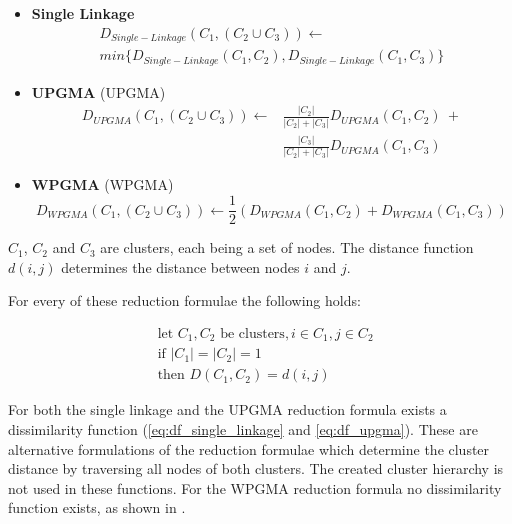 \begin{itemize}
    \item \textbf{Single Linkage}
    \begin{multline}
    D_{Single-Linkage}(C_1, (C_2 \cup C_3)) \leftarrow \\
    min \{ D_{Single-Linkage}(C_1, C_2), D_{Single-Linkage}(C_1, C_3) \}
    \end{multline}
    \item \textbf{\acrshort{UPGMA}} (\acrlong{UPGMA})
    \begin{equation}
    \begin{split}
    D_{UPGMA}(C_1, (C_2 \cup C_3)) \leftarrow &\frac{|C_2|}{|C_2|+|C_3|}D_{UPGMA}(C_1, C_2)\ + \\ &\frac{|C_3|}{|C_2|+|C_3|}D_{UPGMA}(C_1, C_3)
    \end{split}
    \end{equation}
    \item \textbf{\acrshort{WPGMA}} (\acrlong{WPGMA})
    \begin{equation}
    D_{WPGMA}(C_1, (C_2 \cup C_3)) \leftarrow \frac{1}{2} (D_{WPGMA}(C_1, C_2) + D_{WPGMA}(C_1, C_3))
    \end{equation}
\end{itemize}

$C_1$, $C_2$ and $C_3$ are clusters, each being a set of nodes. The distance function $d(i, j)$ determines the distance between nodes $i$ and $j$.

For every of these reduction formulae the following holds:

\begin{equation}
\begin{split}
&\textrm{let }C_1, C_2\textrm{ be clusters}, i \in C_1, j \in C_2 \\
&\textrm{if }|C_1| = |C_2| = 1 \\
&\textrm{then }D(C_1, C_2) = d(i, j)
\end{split}
\end{equation}

For both the single linkage and the \acrshort{UPGMA} reduction formula exists a dissimilarity function (\ref{eq:df_single_linkage} and \ref{eq:df_upgma}). These are alternative formulations of the reduction formulae which determine the cluster distance by traversing all nodes of both clusters. The created cluster hierarchy is not used in these functions. For the \acrshort{WPGMA} reduction formula no dissimilarity function exists, as shown in \cite{clustering:2007}.

